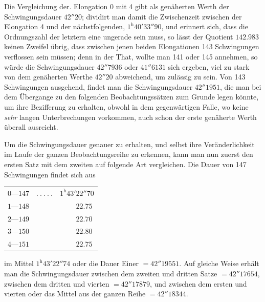 \par{}
\par\clearpage
{}
Die Vergleichung der. Elongation 0 mit 4 gibt als genäherten Werth der Schwingungsdauer $42''20$; dividirt man damit die Zwischenzeit zwischen der Elongation 4 und der nächstfolgenden, $1^{\mathrm{h}}40'33''90$, und erinnert sich, dass die Ordnungszahl der letztern eine ungerade sein muss, so lässt der Quotient $142.983$ keinen Zweifel übrig, dass zwischen jenen beiden Elongationen 143 Schwingungen verflossen sein müssen; denn in der That, wollte man 141 oder 145 annehmen, so würde die Schwingungsdauer $42''7936$ oder $41''6131$ sich ergeben, viel zu stark von dem genäherten Werthe $42''20$ abweichend, um zulässig zu sein. Von 143 Schwingungen ausgehend, findet man die Schwingungsdauer $42''1951$, die man bei dem Übergange zu den folgenden Beobachtungssätzen zum Grunde legen könnte, um ihre Bezifferung zu erhalten, obwohl in dem gegenwärtigen Falle, wo keine \textit{sehr} langen Unterbrechungen vorkommen, auch schon der erste genäherte Werth überall ausreicht.

Um die Schwingungsdauer genauer zu erhalten, und selbst ihre Veränderlichkeit im Laufe der ganzen Beobachtungsreihe zu erkennen, kann man nun zuerst den ersten Satz mit dem zweiten auf folgende Art vergleichen. Die Dauer von 147 Schwingungen findet sich aus
\begin{center}
\begin{tabular}{rcl}
$0\text{—}147$ & $.\ .\ .\ .\ .$ & $1^{\mathrm{h}}43'22''70$\\
$1\text{—}148$ & & $\phantom{1^{\mathrm{h}}43'}22.75$\\
$2\text{—}149$ & & $\phantom{1^{\mathrm{h}}43'}22.70$\\
$3\text{—}150$ & & $\phantom{1^{\mathrm{h}}43'}22.80$\\
$4\text{—}151$ & & $\phantom{1^{\mathrm{h}}43'}22.75$
\end{tabular}
\end{center}
im Mittel $1^{\mathrm{h}}43'22''74$ oder die Dauer Einer $=42''19551$. Auf gleiche Weise erhält man die Schwingungsdauer zwischen dem zweiten und dritten Satze $=42''17654$, zwischen dem dritten und vierten $=42''17879$, und zwischen dem ersten und vierten oder das Mittel aus der ganzen Reihe $=42''18344$.

